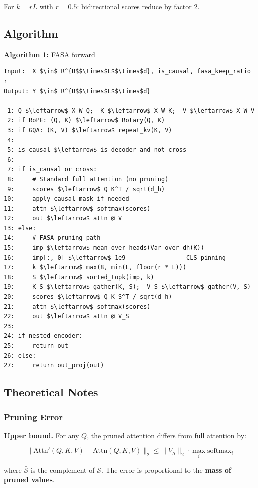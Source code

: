 For $k = rL$ with $r = 0.5$: bidirectional scores reduce by factor 2.

\subsection{Algorithm}

\textbf{Algorithm 1:} FASA forward
\begin{lstlisting}
Input:  X $\in$ R^{B$$\times$L$$\times$d}, is_causal, fasa_keep_ratio r
Output: Y $\in$ R^{B$$\times$L$$\times$d}

 1: Q $\leftarrow$ X W_Q;  K $\leftarrow$ X W_K;  V $\leftarrow$ X W_V
 2: if RoPE: (Q, K) $\leftarrow$ Rotary(Q, K)
 3: if GQA: (K, V) $\leftarrow$ repeat_kv(K, V)
 4:
 5: is_causal $\leftarrow$ is_decoder and not cross
 6:
 7: if is_causal or cross:
 8:     # Standard full attention (no pruning)
 9:     scores $\leftarrow$ Q K^T / sqrt(d_h)
10:     apply causal mask if needed
11:     attn $\leftarrow$ softmax(scores)
12:     out $\leftarrow$ attn @ V
13: else:
14:     # FASA pruning path
15:     imp $\leftarrow$ mean_over_heads(Var_over_dh(K))
16:     imp[:, 0] $\leftarrow$ 1e9                 CLS pinning
17:     k $\leftarrow$ max(8, min(L, floor(r * L)))
18:     S $\leftarrow$ sorted_topk(imp, k)
19:     K_S $\leftarrow$ gather(K, S);  V_S $\leftarrow$ gather(V, S)
20:     scores $\leftarrow$ Q K_S^T / sqrt(d_h)
21:     attn $\leftarrow$ softmax(scores)
22:     out $\leftarrow$ attn @ V_S
23:
24: if nested encoder:
25:     return out
26: else:
27:     return out_proj(out)
\end{lstlisting}

\subsection{Theoretical Notes}

\subsubsection{Pruning Error}

\textbf{Upper bound.} For any $Q$, the pruned attention differs from full attention by:

\[
\|\text{Attn}'(Q, K, V) - \text{Attn}(Q, K, V)\|_2 \leq \|V_{\bar{\mathcal{S}}}\|_2 \cdot \max_i \text{softmax}_i
\tag{4.8}
\]

where $\bar{\mathcal{S}}$ is the complement of $\mathcal{S}$. The error is 
proportional to the \textbf{mass of pruned values}.

